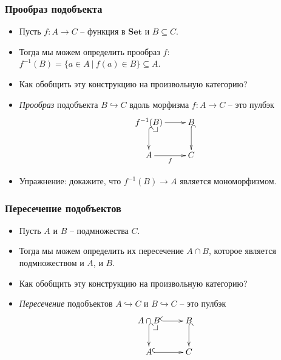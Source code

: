 \documentclass{beamer}
\makeatletter
\theoremstyle{definition}
\newcommand{\cat}[1]{\mathbf{#1}}
\newcommand{\Set}{\cat{Set}}
\newcommand{\pb}[1][dr]{\save*!/#1-1.2pc/#1:(-1,1)@^{|-}\restore}
\makeatother
\begin{document}
\begin{frame}
\frametitle{Прообраз подобъекта}
\begin{itemize}
\item Пусть $f : A \to C$ -- функция в $\Set$ и $B \subseteq C$.
\item Тогда мы можем определить прообраз $f$: $f^{-1}(B) = \{ a \in A\ |\ f(a) \in B \} \subseteq A$.
\item Как обобщить эту конструкцию на произвольную категорию?
\item \emph{Прообраз} подобъекта $B \hookrightarrow C$ вдоль морфизма $f : A \to C$ -- это пулбэк
\[ \xymatrix{ f^{-1}(B) \ar@{^{(}->}[d] \ar[r] \pb & B \ar@{^{(}->}[d] \\
              A \ar[r]_f                           & C
            } \]
\item Упражнение: докажите, что $f^{-1}(B) \to A$ является мономорфизмом.
\end{itemize}
\end{frame}

\begin{frame}
\frametitle{Пересечение подобъектов}
\begin{itemize}
\item Пусть $A$ и $B$ -- подмножества $C$.
\item Тогда мы можем определить их пересечение $A \cap B$, которое является подмножеством и $A$, и $B$.
\item Как обобщить эту конструкцию на произвольную категорию?
\item \emph{Пересечение} подобъектов $A \hookrightarrow C$ и $B \hookrightarrow C$ -- это пулбэк
\[ \xymatrix{ A \cap B \ar@{^{(}->}[d] \ar@{^{(}->}[r] \pb & B \ar@{^{(}->}[d] \\
              A \ar@{^{(}->}[r]                             & C
            } \]
\end{itemize}
\end{frame}
\end{document}
